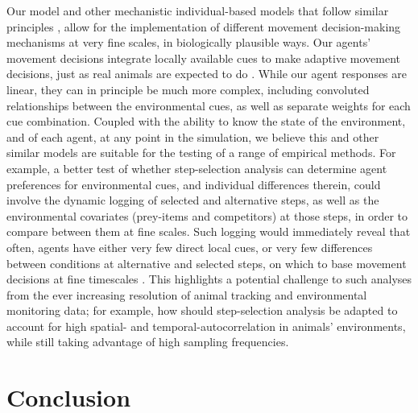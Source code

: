     Our model \citep{gupte2021a,netz2022a} and other mechanistic individual-based models that follow similar principles \citep{getz2015,getz2016,netz2020}, allow for the implementation of different movement decision-making mechanisms at very fine scales, in biologically plausible ways.
    Our agents' movement decisions integrate locally available cues to make adaptive movement decisions, just as real animals are expected to do \citep{nathan2008a}.
    While our agent responses are linear, they can in principle be much more complex, including convoluted relationships between the environmental cues, as well as separate weights for each cue combination.
    Coupled with the ability to know the state of the environment, and of each agent, at any point in the simulation, we believe this and other similar models are suitable for the testing of a range of empirical methods.
    For example, a better test of whether step-selection analysis can determine agent preferences for environmental cues, and individual differences therein, could involve the dynamic logging of selected and alternative steps, as well as the environmental covariates (prey-items and competitors) at those steps, in order to compare between them at fine scales.
    Such logging would immediately reveal that often, agents have either very few direct local cues, or very few differences between conditions at alternative and selected steps, on which to base movement decisions at fine timescales \cite[relatively clueless regions, per][]{perkins1992}.
    This highlights a potential challenge to such analyses from the ever increasing resolution of animal tracking and environmental monitoring data; for example, how should step-selection analysis be adapted to account for high spatial- and temporal-autocorrelation in animals' environments, while still taking advantage of high sampling frequencies.
    
    \section*{Conclusion}
    
